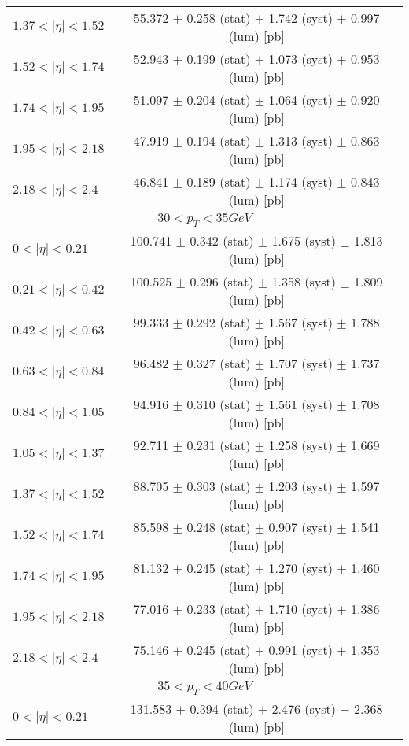 \begin{tabular}{lc}
$1.37 < |\eta| <1.52$          & 55.372 $\pm$ 0.258 (stat) $\pm$ 1.742 (syst) $\pm$ 0.997 (lum) [pb]  \\
$1.52 < |\eta| <1.74$          & 52.943 $\pm$ 0.199 (stat) $\pm$ 1.073 (syst) $\pm$ 0.953 (lum) [pb]  \\
$1.74 < |\eta| <1.95$          & 51.097 $\pm$ 0.204 (stat) $\pm$ 1.064 (syst) $\pm$ 0.920 (lum) [pb]  \\
$1.95 < |\eta| <2.18$          & 47.919 $\pm$ 0.194 (stat) $\pm$ 1.313 (syst) $\pm$ 0.863 (lum) [pb]  \\
$2.18 < |\eta| <2.4$           & 46.841 $\pm$ 0.189 (stat) $\pm$ 1.174 (syst) $\pm$ 0.843 (lum) [pb]  \\
\hline
\multicolumn{2}{c}{$30 < p_{T} < 35 GeV$} \\
\hline
$0 < |\eta| <0.21$             & 100.741 $\pm$ 0.342 (stat) $\pm$ 1.675 (syst) $\pm$ 1.813 (lum) [pb]  \\
$0.21 < |\eta| <0.42$          & 100.525 $\pm$ 0.296 (stat) $\pm$ 1.358 (syst) $\pm$ 1.809 (lum) [pb]  \\
$0.42 < |\eta| <0.63$          & 99.333 $\pm$ 0.292 (stat) $\pm$ 1.567 (syst) $\pm$ 1.788 (lum) [pb]  \\
$0.63 < |\eta| <0.84$          & 96.482 $\pm$ 0.327 (stat) $\pm$ 1.707 (syst) $\pm$ 1.737 (lum) [pb]  \\
$0.84 < |\eta| <1.05$          & 94.916 $\pm$ 0.310 (stat) $\pm$ 1.561 (syst) $\pm$ 1.708 (lum) [pb]  \\
$1.05 < |\eta| <1.37$          & 92.711 $\pm$ 0.231 (stat) $\pm$ 1.258 (syst) $\pm$ 1.669 (lum) [pb]  \\
$1.37 < |\eta| <1.52$          & 88.705 $\pm$ 0.303 (stat) $\pm$ 1.203 (syst) $\pm$ 1.597 (lum) [pb]  \\
$1.52 < |\eta| <1.74$          & 85.598 $\pm$ 0.248 (stat) $\pm$ 0.907 (syst) $\pm$ 1.541 (lum) [pb]  \\
$1.74 < |\eta| <1.95$          & 81.132 $\pm$ 0.245 (stat) $\pm$ 1.270 (syst) $\pm$ 1.460 (lum) [pb]  \\
$1.95 < |\eta| <2.18$          & 77.016 $\pm$ 0.233 (stat) $\pm$ 1.710 (syst) $\pm$ 1.386 (lum) [pb]  \\
$2.18 < |\eta| <2.4$           & 75.146 $\pm$ 0.245 (stat) $\pm$ 0.991 (syst) $\pm$ 1.353 (lum) [pb]  \\
\hline
\multicolumn{2}{c}{$35 < p_{T} < 40 GeV$} \\
\hline
$0 < |\eta| <0.21$             & 131.583 $\pm$ 0.394 (stat) $\pm$ 2.476 (syst) $\pm$ 2.368 (lum) [pb]  \\

\end{tabular}
